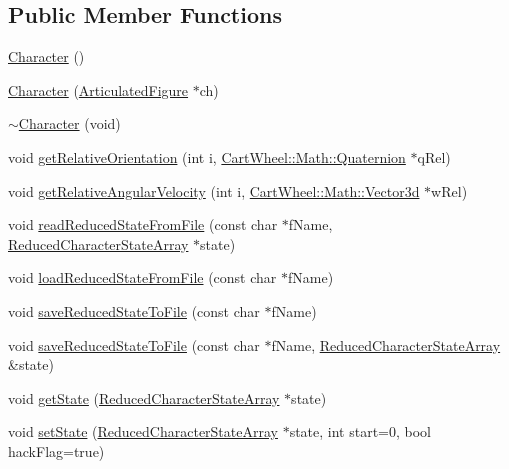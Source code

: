 \subsection*{Public Member Functions}
\begin{DoxyCompactItemize}
\item 
\hyperlink{classCartWheel_1_1Core_1_1Character_adc27bdd255876169bad2ed0bae0cffb5}{Character} ()
\item 
\hyperlink{classCartWheel_1_1Core_1_1Character_ab3561272d3c75cb62cf09635f36fe3d5}{Character} (\hyperlink{classCartWheel_1_1Physics_1_1ArticulatedFigure}{ArticulatedFigure} $\ast$ch)
\item 
\hyperlink{classCartWheel_1_1Core_1_1Character_a377a3df3823a38d5aee3332a30285a04}{$\sim$Character} (void)
\item 
void \hyperlink{classCartWheel_1_1Core_1_1Character_af0d9094560e80c80fd74c3d51f6bafff}{getRelativeOrientation} (int i, \hyperlink{classCartWheel_1_1Math_1_1Quaternion}{CartWheel::Math::Quaternion} $\ast$qRel)
\item 
void \hyperlink{classCartWheel_1_1Core_1_1Character_abafe6f70e8f4a202b37b9a6c488c7a2b}{getRelativeAngularVelocity} (int i, \hyperlink{classCartWheel_1_1Math_1_1Vector3d}{CartWheel::Math::Vector3d} $\ast$wRel)
\item 
void \hyperlink{classCartWheel_1_1Core_1_1Character_a888c025d010c24ad3ca3aa19fad65e11}{readReducedStateFromFile} (const char $\ast$fName, \hyperlink{classCartWheel_1_1Core_1_1ReducedCharacterStateArray}{ReducedCharacterStateArray} $\ast$state)
\item 
void \hyperlink{classCartWheel_1_1Core_1_1Character_a1efceb80f22e15bfee75f80852156fed}{loadReducedStateFromFile} (const char $\ast$fName)
\item 
void \hyperlink{classCartWheel_1_1Core_1_1Character_a9b5120d9522efa88fb44c0582e5aabd8}{saveReducedStateToFile} (const char $\ast$fName)
\item 
void \hyperlink{classCartWheel_1_1Core_1_1Character_aa3050f472d91fa5ead537e8ad6d51a7e}{saveReducedStateToFile} (const char $\ast$fName, \hyperlink{classCartWheel_1_1Core_1_1ReducedCharacterStateArray}{ReducedCharacterStateArray} \&state)
\item 
void \hyperlink{classCartWheel_1_1Core_1_1Character_a690c7d5b7d36bdb1997558ab42bdc917}{getState} (\hyperlink{classCartWheel_1_1Core_1_1ReducedCharacterStateArray}{ReducedCharacterStateArray} $\ast$state)
\item 
void \hyperlink{classCartWheel_1_1Core_1_1Character_a03c2f7a1318a2f6c5e6d1cafbdcf288a}{setState} (\hyperlink{classCartWheel_1_1Core_1_1ReducedCharacterStateArray}{ReducedCharacterStateArray} $\ast$state, int start=0, bool hackFlag=true)

\end{DoxyCompactItemize}
